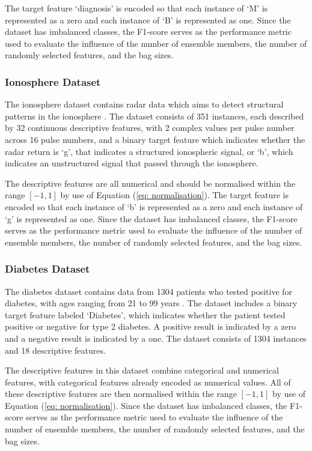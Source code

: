 \documentclass[10pt, conference]{IEEEtran}
\begin{document}
The target feature `diagnosis' is encoded so that each instance of `M' is represented as a zero and each instance
of `B' is represented as one. Since the dataset has imbalanced classes, the F1-score serves as the performance
metric used to evaluate the influence of the number of ensemble members, the number of randomly selected features,
and the bag sizes.

\subsubsection{Ionosphere Dataset}

The ionosphere dataset contains radar data which aims to detect structural patterns in the ionosphere \cite{Ionosphere_ref}. The dataset consists
of 351 instances, each described by 32 continuous descriptive features, with 2 complex values per pulse number across 16 pulse
numbers, and a binary target feature which indicates whether the radar return is `g', that indicates a structured
ionospheric signal, or `b', which indicates an unstructured signal that passed through the ionosphere.

The descriptive features are all numerical and should be normalised within the range $[-1,1]$ by use of Equation (\ref{eq: normalisation}).
The target feature is encoded so that each instance of `b' is represented as a zero and each instance of `g' is represented as one.
Since the dataset has imbalanced classes, the F1-score serves as the performance metric used to evaluate the influence of the number of
ensemble members, the number of randomly selected features, and the bag sizes.

\subsubsection{Diabetes Dataset}

The diabetes dataset contains data from 1304 patients who tested positive for diabetes, with ages ranging from
21 to 99 years \cite{Diabetes_ref}. The dataset includes a binary target feature labeled `Diabetes', which indicates whether the patient tested
positive or negative for type 2 diabetes. A positive result is indicated by a zero and a negative result is indicated by a one.
The dataset consists of 1304 instances and 18 descriptive features.

The descriptive features in this dataset combine categorical and numerical features, with categorical features already encoded
as numerical values. All of these descriptive features are then normalised within the range $[-1,1]$
by use of Equation (\ref{eq: normalisation}). Since the dataset has imbalanced classes, the F1-score serves as the performance
metric used to evaluate the influence of the number of ensemble members, the number of randomly selected features, and the bag sizes.
\end{document}
